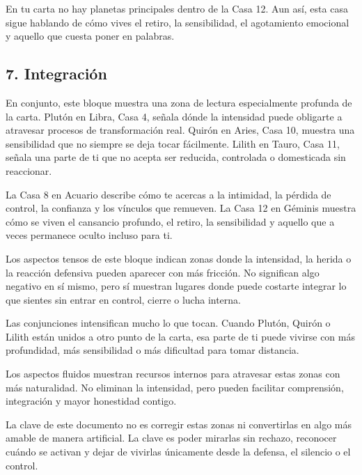 \documentclass[11pt,a4paper]{article}
\begin{document}
En tu carta no hay planetas principales dentro de la Casa 12. Aun así, esta casa sigue hablando de cómo vives el retiro, la sensibilidad, el agotamiento emocional y aquello que cuesta poner en palabras.

\vspace{0.4cm}

\subsection{7. Integración}

En conjunto, este bloque muestra una zona de lectura especialmente profunda de la carta. Plutón en Libra, Casa 4, señala dónde la intensidad puede obligarte a atravesar procesos de transformación real. Quirón en Aries, Casa 10, muestra una sensibilidad que no siempre se deja tocar fácilmente. Lilith en Tauro, Casa 11, señala una parte de ti que no acepta ser reducida, controlada o domesticada sin reaccionar.

La Casa 8 en Acuario describe cómo te acercas a la intimidad, la pérdida de control, la confianza y los vínculos que remueven. La Casa 12 en Géminis muestra cómo se viven el cansancio profundo, el retiro, la sensibilidad y aquello que a veces permanece oculto incluso para ti.

Los aspectos tensos de este bloque indican zonas donde la intensidad, la herida o la reacción defensiva pueden aparecer con más fricción. No significan algo negativo en sí mismo, pero sí muestran lugares donde puede costarte integrar lo que sientes sin entrar en control, cierre o lucha interna.

Las conjunciones intensifican mucho lo que tocan. Cuando Plutón, Quirón o Lilith están unidos a otro punto de la carta, esa parte de ti puede vivirse con más profundidad, más sensibilidad o más dificultad para tomar distancia.

Los aspectos fluidos muestran recursos internos para atravesar estas zonas con más naturalidad. No eliminan la intensidad, pero pueden facilitar comprensión, integración y mayor honestidad contigo.

La clave de este documento no es corregir estas zonas ni convertirlas en algo más amable de manera artificial. La clave es poder mirarlas sin rechazo, reconocer cuándo se activan y dejar de vivirlas únicamente desde la defensa, el silencio o el control.

\vspace{0.4cm}
\end{document}
